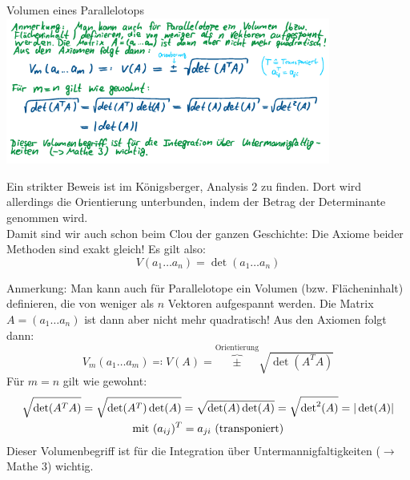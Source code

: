 \begin{Beispiel}{Volumen eines Parallelotops}
\includegraphics[width=0.8\textwidth]{Dateien/00/14Parallelotop2.png}

Ein strikter Beweis ist im Königsberger, Analysis 2 zu finden. Dort wird allerdings die Orientierung unterbunden, indem
der Betrag der Determinante genommen wird.\\
Damit sind wir auch schon beim Clou der ganzen Geschichte: Die Axiome
beider Methoden sind exakt gleich! Es gilt also:
\begin{equation}
    V(a_1\ldots a_n) = \det(a_1\ldots a_n)
\end{equation}

Anmerkung: Man kann auch für Parallelotope ein Volumen (bzw. Flächeninhalt) definieren, die von weniger als $n$ Vektoren
aufgespannt werden. Die Matrix $A=(a_1\ldots a_n)$ ist dann aber nicht mehr quadratisch! Aus den Axiomen folgt dann:
\begin{equation}
    V_m(a_1\ldots a_m) \eqqcolon V(A) = \overbrace{\pm}^{\text{Orientierung}} \sqrt{\det(A^TA)}
\end{equation}
Für $m=n$ gilt wie gewohnt:
\begin{gather}
    \sqrt{\det(A^TA)} = \sqrt{\det(A^T)\det(A)} = \sqrt{\det(A)\det(A)} = \sqrt{{\det}^2(A)} = |\det(A)| \\
    \text{mit } (a_{ij})^T = a_{ji} \text{ (transponiert)}\notag
\end{gather}
Dieser Volumenbegriff ist für die Integration über Untermannigfaltigkeiten ($\to$ Mathe 3) wichtig.
\end{Beispiel}


